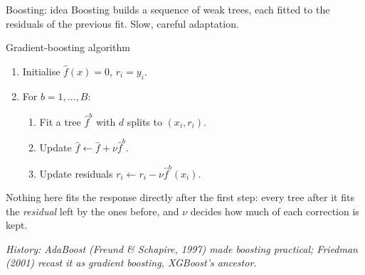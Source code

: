 \documentclass[aspectratio=169,11pt]{beamer}
\begin{document}
\begin{frame}{Boosting: idea}\label{frm:boost}
  Boosting builds a sequence of weak trees, each fitted to the
  residuals of the previous fit. Slow, careful adaptation.
  \begin{block}{Gradient-boosting algorithm}
    \begin{enumerate}
      \item Initialise $\hat f(x) = 0$, $r_i = y_i$.
      \item For $b = 1, \ldots, B$:
        \begin{enumerate}
          \item Fit a tree $\hat f^b$ with $d$ splits to $(x_i, r_i)$.
          \item Update $\hat f \leftarrow \hat f + \nu \hat f^b$.
          \item Update residuals
                $r_i \leftarrow r_i - \nu \hat f^b(x_i)$.
        \end{enumerate}
    \end{enumerate}
  \end{block}
  \begin{takeaway}
    Nothing here fits the response directly after the first step: every
    tree after it fits the \emph{residual} left by the ones before, and
    $\nu$ decides how much of each correction is kept.
  \end{takeaway}
  \par{\tiny\itshape\color{gray}History: AdaBoost (Freund \& Schapire, 1997)
  made boosting practical; Friedman (2001) recast it as gradient boosting,
  XGBoost's ancestor.}
\end{frame}
\end{document}
